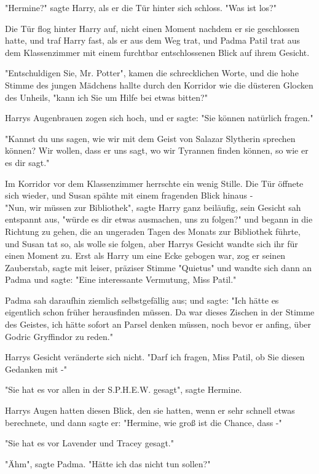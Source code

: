 {"Hermine?" sagte Harry, als er die Tür hinter sich schloss. "Was ist los?"

Die Tür flog hinter Harry auf, nicht einen Moment nachdem er sie geschlossen hatte, und traf Harry fast, als er aus dem Weg trat, und Padma Patil trat aus dem Klassenzimmer mit einem furchtbar entschlossenen Blick auf ihrem Gesicht.

"Entschuldigen Sie, Mr. Potter", kamen die schrecklichen Worte, und die hohe Stimme des jungen Mädchens hallte durch den Korridor wie die düsteren Glocken des Unheils, "kann ich Sie um Hilfe bei etwas bitten?"

Harrys Augenbrauen zogen sich hoch, und er sagte: "Sie können natürlich fragen."

"Kannst du uns sagen, wie wir mit dem Geist von Salazar Slytherin sprechen können? Wir wollen, dass er uns sagt, wo wir Tyrannen finden können, so wie er es dir sagt."

Im Korridor vor dem Klassenzimmer herrschte ein wenig Stille. Die Tür öffnete sich wieder, und Susan spähte mit einem fragenden Blick hinaus -\\ "Nun, wir müssen zur Bibliothek", sagte Harry ganz beiläufig, sein Gesicht sah entspannt aus, "würde es dir etwas ausmachen, uns zu folgen?" und begann in die Richtung zu gehen, die an ungeraden Tagen des Monats zur Bibliothek führte, und Susan tat so, als wolle sie folgen, aber Harrys Gesicht wandte sich ihr für einen Moment zu. Erst als Harry um eine Ecke gebogen war, zog er seinen Zauberstab, sagte mit leiser, präziser Stimme "Quietus" und wandte sich dann an Padma und sagte: "Eine interessante Vermutung, Miss Patil."

Padma sah daraufhin ziemlich selbstgefällig aus; und sagte: "Ich hätte es eigentlich schon früher herausfinden müssen. Da war dieses Zischen in der Stimme des Geistes, ich hätte sofort an Parsel denken müssen, noch bevor er anfing, über Godric Gryffindor zu reden."

Harrys Gesicht veränderte sich nicht. "Darf ich fragen, Miss Patil, ob Sie diesen Gedanken mit -"

"Sie hat es vor allen in der S.P.H.E.W. gesagt", sagte Hermine.

Harrys Augen hatten diesen Blick, den sie hatten, wenn er sehr schnell etwas berechnete, und dann sagte er: "Hermine, wie groß ist die Chance, dass -"

"Sie hat es vor Lavender und Tracey gesagt."

"Ähm", sagte Padma. "Hätte ich das nicht tun sollen?"

}
